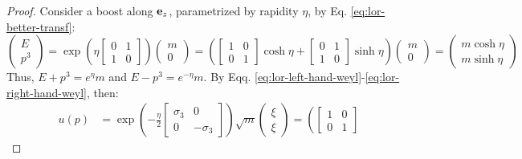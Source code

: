 \begin{proposition}{}{}
  \begin{proof}
    Consider a boost along $ \mathbf{e}_z $, parametrized by rapidity $ \eta $, by Eq. \ref{eq:lor-better-transf}:
    \begin{equation*}
      \begin{pmatrix}
        E \\ p^3
      \end{pmatrix}
      = \exp \left( \eta
        \begin{bmatrix}
          0 & 1 \\ 1 & 0
        \end{bmatrix}
      \right)
      \begin{pmatrix}
        m \\ 0
      \end{pmatrix}
      = \left(
        \begin{bmatrix}
          1 & 0 \\ 0 & 1
        \end{bmatrix}
      \cosh \eta +
        \begin{bmatrix}
          0 & 1 \\ 1 & 0
        \end{bmatrix}
      \sinh \eta \right)
      \begin{pmatrix}
        m \\ 0
      \end{pmatrix}
      =
      \begin{pmatrix}
        m \cosh \eta \\ m \sinh \eta
      \end{pmatrix}
    \end{equation*}
    Thus, $ E + p^3 = e^\eta m $ and $ E - p^3 = e^{-\eta} m $. By Eqq. \ref{eq:lor-left-hand-weyl}-\ref{eq:lor-right-hand-weyl}, then:
    \begin{equation*}
      \begin{split}
        u(p) &= \exp \left( - \frac{\eta}{2}
          \begin{bmatrix}
            \sigma_3 & 0 \\ 0 & - \sigma_3
          \end{bmatrix}
        \right) \sqrt{m}
        \begin{pmatrix}
          \xi \\ \xi
        \end{pmatrix} = \left(
                  \begin{bmatrix}
                  1 & 0 \\ 0 & 1
                  \end{bmatrix}

\end{split}
\end{equation*}
\end{proof}
\end{proposition}
